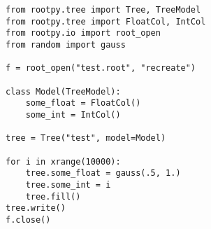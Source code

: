 \begin{footnotesize}
\begin{verbatim}
from rootpy.tree import Tree, TreeModel
from rootpy.tree import FloatCol, IntCol
from rootpy.io import root_open
from random import gauss

f = root_open("test.root", "recreate")

class Model(TreeModel):
    some_float = FloatCol()
    some_int = IntCol()

tree = Tree("test", model=Model)

for i in xrange(10000):
    tree.some_float = gauss(.5, 1.)
    tree.some_int = i
    tree.fill()
tree.write()
f.close()
\end{verbatim}
\end{footnotesize}
